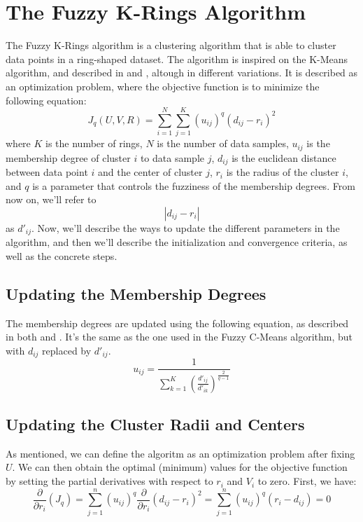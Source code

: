 \documentclass[conference]{IEEEtran}
\begin{document}
\section{The Fuzzy K-Rings Algorithm}
The Fuzzy K-Rings algorithm is a clustering algorithm that is able to cluster data points in a ring-shaped dataset.
The algorithm is inspired on the K-Means algorithm, and described in \cite{DAVE1992713} and \cite{308484}, altough in different variations.
It is described as an optimization problem, where the objective function is to minimize the following equation:
\begin{equation}\label{eq:objective}
J_q(U, V, R) = \sum_{i=1}^{N} \sum_{j=1}^{K} (u_{ij})^q (d_{ij} - r_i)^2
\end{equation}
where $K$ is the number of rings, $N$ is the number of data samples, $u_{ij}$ is the membership degree of cluster $i$ to data sample $j$, $d_{ij}$ is the euclidean distance between data point $i$ and the center of cluster $j$, $r_i$ is the radius of the cluster $i$, and $q$ is a parameter that controls the fuzziness of the membership degrees.
From now on, we'll refer to $$|d_{ij} - r_i|$$ as $d'_{ij}$.
Now, we'll describe the ways to update the different parameters in the algorithm, and then we'll describe the initialization and convergence criteria, as well as the concrete steps.

\subsection{Updating the Membership Degrees}
The membership degrees are updated using the following equation, as described in both \cite{DAVE1992713} and \cite{308484}. It's the same as the one used in the Fuzzy C-Means algorithm, but with $d_{ij}$ replaced by $d'_{ij}$.
\begin{equation}
u_{ij} = \frac{1}{\sum_{k=1}^{K} \left(\frac{d'_{ij}}{d'_{ik}}\right)^{\frac{2}{q-1}}}
\end{equation}

\subsection{Updating the Cluster Radii and Centers}
As mentioned, we can define the algoritm as an optimization problem after fixing $U$. We can then obtain the optimal (minimum) values for the objective function
by setting the partial derivatives with respect to $r_i$ and $V_i$ to zero.
First, we have:
\begin{equation}\label{eq:d_dr}
\frac{\partial}{\partial r_i}(J_q) = \sum_{j=1}^{n} (u_{ij})^q\frac{\partial}{\partial r_i} (d_{ij} - r_i)^2 = \sum_{j=1}^{n} (u_{ij})^q (r_i - d_{ij}) = 0
\end{equation}
\end{document}
